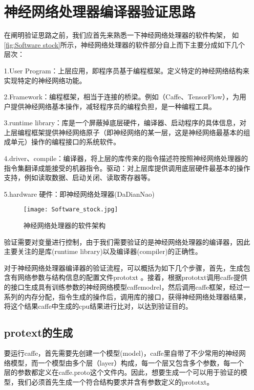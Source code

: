 \chapter{神经网络处理器编译器验证思路}

在阐明验证思路之前，我们应首先来熟悉一下神经网络处理器的软件构架， 如\autoref{fig:Software stock}所示，神经网络处理器的软件部分自上而下主要分成如下几个层次：

1.User Program：上层应用，即程序员基于编程框架。定义特定的神经网络结构来实现特定的神经网络功能。

2.Framework：编程框架，相当于连接的桥梁。例如（Caffe、TensorFlow），为用户提供神经网络基本操作，减轻程序员的编程负担，是一种编程工具。

3.runtime library：库是一个屏蔽掉底层硬件，编译器、启动程序的具体信息，对上层编程框架提供神经网络原子（即神经网络的某一层，这是神经网络最基本的组成单元）操作的编程接口的系统软件。

4.driver、compile：编译器，将上层的库传来的指令描述符按照神经网络处理器的指令集翻译成能接受的机器指令。驱动：对上层库提供调用底层硬件最基本的操作支持，例如读取数据、启动关闭、读取寄存器等。

5.hardware 硬件：即神经网络处理器(DaDianNao)

\begin{figure}[!htbp]
\centering
\texttt{[image: Software\_stock.jpg]}
\caption{神经网络处理器的软件架构}
\label{fig:Software stock}
\end{figure}

验证需要对变量进行控制，由于我们需要验证的是神经网络处理器的编译器，因此主要关注的是库(runtime library)以及编译器(compiler)的正确性。

对于神经网络处理器编译器的验证流程，可以概括为如下几个步骤，首先，生成包含有网络参数与结构信息的配置文件prototxt 。接着，根据prototxt调用caffe提供的接口生成具有训练参数的神经网络模型caffemodrel，然后调用caffe框架，经过一系列的内存分配，指令生成的操作后，调用库的接口，获得神经网络处理器结果，将这个结果caffe中生成的cpu结果进行比对，以达到验证目的。

\section{protext的生成}
要运行caffe，首先需要先创建一个模型(model)，caffe里自带了不少常用的神经网络模型，而一个模型由多个层（layer）构成，每一个层又包含多个参数，每一个层的参数都定义在caffe.proto这个文件内。因此，想要生成一个可以用于验证的模型，我们必须首先生成一个符合结构要求并含有参数定义的prototxt。

